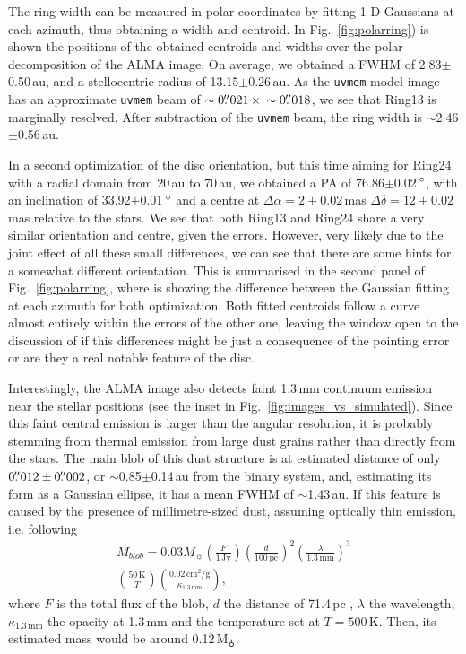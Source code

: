 \documentclass[fleqn,usenatbib,useAMS]{mnras}
\begin{document}
The ring width can be measured in polar coordinates by fitting 1-D Gaussians at each azimuth, thus obtaining a width and centroid. In Fig.~\ref{fig:polarring}) is shown the positions of the obtained centroids and widths over the polar decomposition of the ALMA image. On average, we obtained a FWHM of 2.83$\pm$0.50\,au, and a stellocentric radius of 13.15$\pm$0.26\,au. As the {\tt uvmem} model image has an approximate {\tt uvmem} beam of $\sim0\hbox{$.\!\!^{\prime\prime}$}021 \,\times \,\sim0\hbox{$.\!\!^{\prime\prime}$}018$, we see that Ring13 is marginally resolved. After subtraction of the {\tt uvmem} beam, the ring width is $\sim$2.46$\pm$0.56\,au.

In a second optimization of the disc orientation, but this time aiming for Ring24 with a radial domain from 20\,au to 70\,au, we obtained a PA of 76.86$\pm$0.02\,$\hbox{$^\circ$}$, with an inclination of 33.92$\pm$0.01\,$\hbox{$^\circ$}$ and a centre at $\Delta \alpha = 2\pm0.02$\,mas $\Delta \delta = 12\pm0.02$\,mas relative to the stars. We see that both Ring13 and Ring24 share a very similar orientation and centre, given the errors. However, very likely due to the joint effect of all these small differences, we can see that there are some hints for a somewhat different orientation. This is summarised in the second panel of Fig.~\ref{fig:polarring}, where is showing the difference between the Gaussian fitting at each azimuth for both optimization. Both fitted centroids follow a curve almost entirely within the errors of the other one, leaving the window open to the discussion of if this differences might be just a consequence of the pointing error or are they a real notable feature of the disc.

Interestingly, the ALMA image also detects faint 1.3\,mm continuum emission near the stellar positions (see the inset in Fig.~\ref{fig:images_vs_simulated}). Since this faint central emission is larger than the angular resolution, it is probably stemming from thermal emission from  large dust grains rather than directly from the stars. The main blob of this dust structure is at estimated distance of only $0\hbox{$.\!\!^{\prime\prime}$}012\pm0\hbox{$.\!\!^{\prime\prime}$}002$, or $\sim$0.85$\pm$0.14\,au from the binary system, and, estimating its form as a Gaussian ellipse, it has a mean FWHM of $\sim$1.43\,au. If this feature is caused by the presence of millimetre-sized dust, assuming optically thin emission, i.e. following
\begin{multline}
    \label{optically_thin_equation}
      M_{blob} = 0.03 M_{\sun} \left(\frac{F}{1\,\mathrm{Jy}}\right) \left(\frac{d}{100\,\mathrm{pc}}\right)^2 \left(\frac{\lambda}{1.3\,\mathrm{mm}}\right)^3 
      \\
      \left(\frac{50\,\mathrm{K}}{T}\right)    \left(\frac{0.02\,\mathrm{cm^2/g}}{\kappa_{1.3\,\mathrm{mm}}}\right),
\end{multline}
where $F$ is the total flux of the blob, $d$ the distance of 71.4\,pc , $\lambda$ the wavelength, $\kappa_{1.3\,\mathrm{mm}}$ the opacity at 1.3\,mm and the temperature set at $T=500\,\mathrm{K}$. Then, its estimated mass would be around 0.12\,M$_{\earth}$.
\end{document}
